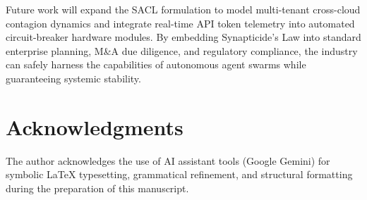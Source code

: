 Future work will expand the SACL formulation to model multi-tenant cross-cloud contagion dynamics and integrate real-time API token telemetry into automated circuit-breaker hardware modules. By embedding Synapticide's Law into standard enterprise planning, M\&A due diligence, and regulatory compliance, the industry can safely harness the capabilities of autonomous agent swarms while guaranteeing systemic stability.

\section*{Acknowledgments}
The author acknowledges the use of AI assistant tools (Google Gemini) for symbolic \LaTeX{} typesetting, grammatical refinement, and structural formatting during the preparation of this manuscript.